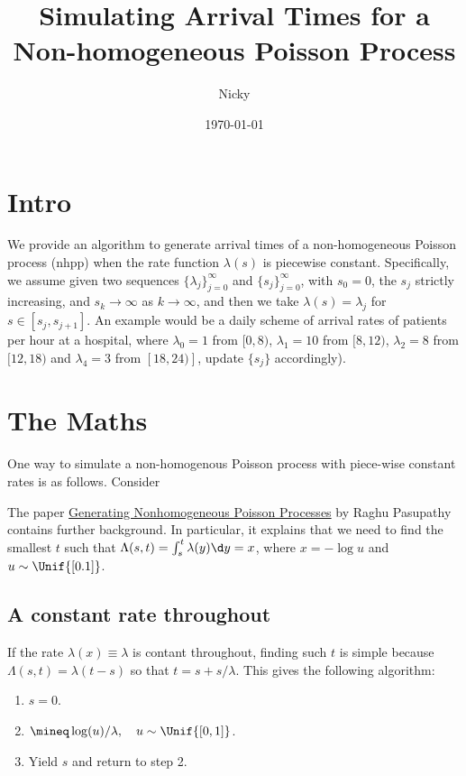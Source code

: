 \documentclass[a4paper]{article}
\author{Nicky}
\date{\today}
\title{Simulating  Arrival Times for a Non-homogeneous Poisson Process}
\begin{document}
\maketitle
\tableofcontents

\section{Intro}
\label{sec:org8d9a843}

We provide an algorithm to generate arrival times of a non-homogeneous Poisson process (nhpp) when the rate function \(\lambda(s)\) is piecewise constant.
Specifically, we assume given two sequences \(\{\lambda_{j}\}_{j=0}^{\infty}\) and \(\{s_{j}\}_{j=0}^{\infty}\), with \(s_{0}=0\),  the \(s_{j}\) strictly increasing, and \(s_{k}\to \infty\) as \(k\to\infty\), and then we take \(\lambda(s) = \lambda_{j}\) for \(s\in [s_{j}, s_{j+1}]\).
An example would be a daily scheme of arrival rates of patients per hour at a hospital, where \(\lambda_{0} = 1\) from \([0, 8)\), \(\lambda_{1} = 10\) from \([8, 12)\), \(\lambda_{2} = 8\) from \([12, 18)\) and \(\lambda_{4}=3\) from \([18, 24)]\),  update \(\{s_{j}\}\) accordingly).
\section{The Maths}
\label{sec:orga91c10a}

One way to simulate a non-homogenous Poisson process with piece-wise constant rates is as follows. Consider 


The paper \href{https://web.ics.purdue.edu/\~pasupath/PAPERS/2011pasB.pdf}{Generating Nonhomogeneous Poisson Processes} by Raghu Pasupathy contains further background.
In particular, it explains that we need to find the smallest \(t\) such that \(\Lambda (s, t) = \int_{s}^{t} \lambda(y)\d y =x\), where \(x = -\log u\) and \(u\sim\Unif{[0.1]}\).
\subsection{A constant rate throughout}
\label{sec:org07316a0}

If the rate \(\lambda(x) \equiv \lambda\) is contant throughout, finding such \(t\) is simple because \(\Lambda(s, t) = \lambda (t-s)\) so that \(t= s + s/\lambda\).
This gives the following algorithm:
\begin{enumerate}
\item \(s = 0\).
\item \(\mineq \log(u)/\lambda, \quad u \sim \Unif{[0,1]}\).
\item Yield \(s\) and return to step 2.
\end{enumerate}
\end{document}
